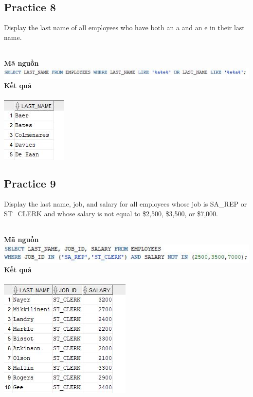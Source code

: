 \documentclass[12pt,a4paper]{report}
\begin{document}
\subsection{Practice 8}
\begin{boxedminipage}[t]{15.5cm}
	Display the last name of all employees who have both an a and an e in their last name.
\end{boxedminipage}
\newline
\\
\textbf{Mã nguồn}
\\
\newline
\includegraphics[scale=.95]{84.jpg}\\
\textbf{Kết quả}\\\\
\includegraphics[scale=1]{k84.jpg}

\subsection{Practice 9}
\begin{boxedminipage}[t]{15.5cm}
	Display the last name, job, and salary for all employees whose job is SA\_REP or ST\_CLERK and 
	whose salary is not equal to \$2,500, \$3,500, or \$7,000.
\end{boxedminipage}
\newline
\\
\textbf{Mã nguồn}
\\
\newline
\includegraphics[scale=1]{94.jpg}\\
\textbf{Kết quả}\\\\
\includegraphics[scale=1]{k94.jpg}
\end{document}
